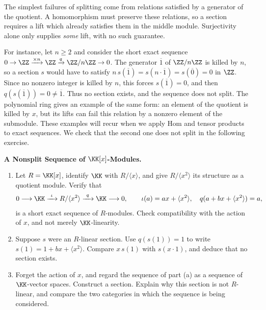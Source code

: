 \documentclass[12pt,reqno]{amsart}
\begin{document}
\hrulefill

The simplest failures of splitting come from relations satisfied by a generator of the quotient. A homomorphism must preserve these relations, so a section requires a lift which already satisfies them in the middle module. Surjectivity alone only supplies \emph{some} lift, with no such guarantee.

For instance, let $n\geq2$ and consider the short exact sequence $0\to\ZZ\xrightarrow{\times n}\ZZ\xrightarrow{q}\ZZ/n\ZZ\to0$. The generator $\overline1$ of $\ZZ/n\ZZ$ is killed by $n$, so a section $s$ would have to satisfy $n\,s(\overline1)=s(n\cdot\overline1)=s(\overline0)=0$ in $\ZZ$. Since no nonzero integer is killed by $n$, this forces $s(\overline1)=0$, and then $q(s(\overline1))=0\neq\overline1$. Thus no section exists, and the sequence does not split. The polynomial ring gives an example of the same form: an element of the quotient is killed by $x$, but its lifts can fail this relation by a nonzero element of the submodule. These examples will recur when we apply Hom and tensor products to exact sequences. We check that the second one does not split in the following exercise.

\hrulefill

\begin{problems}
\item\label{p:nonsplit} \textbf{A Nonsplit Sequence of $\KK[x]$-Modules.}
\begin{enumerate}
\item Let $R=\KK[x]$, identify $\KK$ with $R/\langle x\rangle$, and give $R/\langle x^2\rangle$ its structure as a quotient module. Verify that
\[
0\longrightarrow\KK\xrightarrow{\ \iota\ }R/\langle x^2\rangle\xrightarrow{\ q\ }\KK\longrightarrow0,\qquad\iota(a)=ax+\langle x^2\rangle,\quad q(a+bx+\langle x^2\rangle)=a,
\]
is a short exact sequence of $R$-modules. Check compatibility with the action of $x$, and not merely $\KK$-linearity.
\item Suppose $s$ were an $R$-linear section. Use $q(s(1))=1$ to write $s(1)=1+bx+\langle x^2\rangle$. Compare $x\,s(1)$ with $s(x\cdot1)$, and deduce that no section exists.
\item Forget the action of $x$, and regard the sequence of part (a) as a sequence of $\KK$-vector spaces. Construct a section. Explain why this section is not $R$-linear, and compare the two categories in which the sequence is being considered.
\end{enumerate}
\end{problems}
\end{document}
